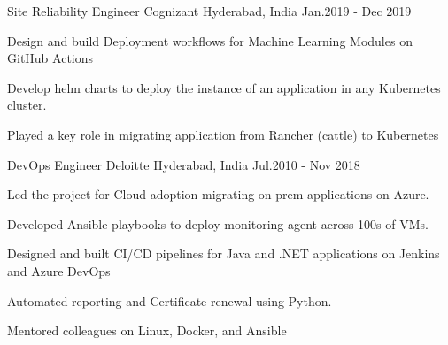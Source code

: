 \begin{cventries}
\vspace{1\baselineskip}
  \cventry
    { Site Reliability Engineer } %
    {Cognizant} %
    {Hyderabad, India} %
    {Jan.2019 - Dec 2019 } %
    {
      \begin{cvitems} %
        \item {Design and build Deployment workflows for Machine Learning Modules on GitHub Actions}
        \item {Develop helm charts to deploy the instance of an application in any Kubernetes cluster. }
        \item { Played a key role in migrating application from Rancher (cattle) to Kubernetes }
      \end{cvitems}
    }
\vspace{1\baselineskip}
  \cventry
    { DevOps Engineer } %
    {Deloitte} %
    {Hyderabad, India} %
    {Jul.2010 -  Nov 2018 } %
    {
      \begin{cvitems} %
        \item {Led the project for Cloud adoption migrating on-prem applications on Azure.}
        \item {Developed Ansible playbooks to deploy monitoring agent across 100s of VMs.}
        \item {Designed and built CI/CD pipelines for Java and .NET applications on Jenkins and Azure DevOps}   
        \item {Automated reporting and Certificate renewal using Python.}
        \item {Mentored colleagues on Linux, Docker, and Ansible}
      \end{cvitems}
    }

\end{cventries}
